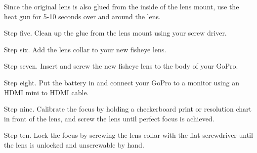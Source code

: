 \begin{fullwidth}

\tip Since the original lens is also glued from the inside of the lens mount, use the heat gun for 5-10 seconds over and around the lens. 

Step five. Clean up the glue from the lens mount using your screw driver.


Step six. Add the lens collar to your new fisheye lens.


Step seven. Insert and screw the new fisheye lens to the body of your GoPro.


Step eight. Put the battery in and connect your GoPro to a monitor using an HDMI mini to HDMI cable.


Step nine. Calibrate the focus by holding a checkerboard print or resolution chart in front of the lens, and screw the lens until perfect focus is achieved. 


Step ten. Lock the focus by screwing the lens collar with the flat screwdriver until the lens is unlocked and unscrewable by hand.


\clearpage
\end{fullwidth}
